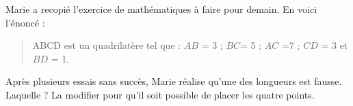 
\begin{exercice}\label{exosmath-0771}

Marie a recopié l'exercice de mathématiques à faire pour demain. En voici l'énoncé :
\begin{quote}
    ABCD est un quadrilatère tel que : $AB$ = \unit{3}{\centi\meter} ; $BC $= \unit{5}{\centi\meter} ; $AC$ =\unit{7}{\centi\meter} ; $CD$ = \unit{3}{\centi\meter} et $BD$ = \unit{1}{\centi\meter}. 
\end{quote}
Après plusieurs essais sans succès, Marie réalise qu'une des longueurs est fausse.  Laquelle ? La modifier pour qu'il soit possible de placer les quatre points.

\end{exercice}
